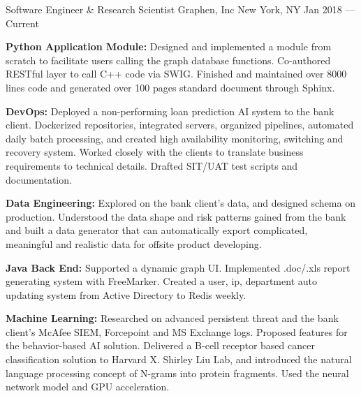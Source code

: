 

\begin{cventries}
	
	\cventry
	{Software Engineer \& Research Scientist} %
	{Graphen, Inc} %
	{New York, NY} %
	{Jan 2018 –– Current} %
	{
		\begin{cvitems} %
			\item {\textbf{Python Application Module:} Designed and implemented a module from scratch to facilitate users calling the graph database functions. Co-authored RESTful layer to call C++ code via SWIG. Finished and maintained over 8000 lines code and generated over 100 pages standard document through Sphinx.}
			\item {\textbf{DevOps:} Deployed a non-performing loan prediction AI system to the bank client. Dockerized repositories, integrated servers, organized pipelines, automated daily batch processing, and created high availability monitoring, switching and recovery system. Worked closely with the clients to translate business requirements to technical details. Drafted SIT/UAT test scripts and documentation.}
			\item {\textbf{Data Engineering:} Explored on the bank client's data, and designed schema on production. Understood the data shape and risk patterns gained from the bank and built a data generator that can automatically export complicated, meaningful and realistic data for offsite product developing.}
			\item {\textbf{Java Back End:} Supported a dynamic graph UI. Implemented .doc/.xls report generating system with FreeMarker. Created a user, ip, department auto updating system from Active Directory to Redis weekly.}
			\item {\textbf{Machine Learning:} Researched on advanced persistent threat and the bank client's McAfee SIEM, Forcepoint and MS Exchange logs. Proposed features for the behavior-based AI solution. Delivered a B-cell receptor based cancer classification solution to Harvard X. Shirley Liu Lab, and introduced the natural language processing concept of N-grams into protein fragments. Used the neural network model and GPU acceleration.}
		\end{cvitems}
	}


\end{cventries}
